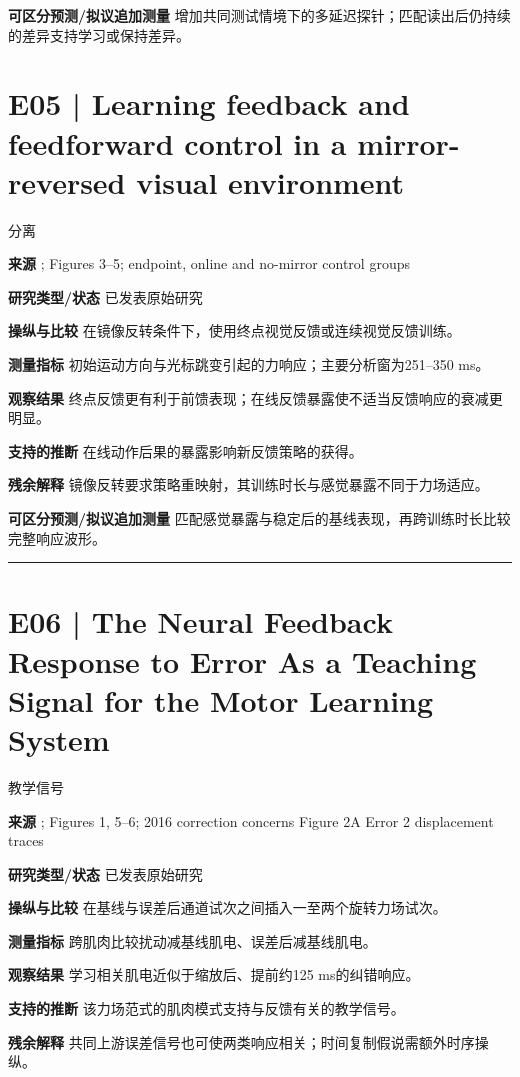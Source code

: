 \documentclass[11pt,a4paper]{article}
\begin{document}
\textbf{可区分预测/拟议追加测量} 增加共同测试情境下的多延迟探针；匹配读出后仍持续的差异支持学习或保持差异。\par
\clearpage\section{E05 | Learning feedback and feedforward control in a mirror-reversed visual environment}
{\small\sffamily\color{navy} 分离}\par
\textbf{来源} \cite{kasuga2015}; Figures 3--5; endpoint, online and no-mirror control groups\par
\textbf{研究类型/状态} 已发表原始研究\par
\textbf{操纵与比较} 在镜像反转条件下，使用终点视觉反馈或连续视觉反馈训练。\par
\textbf{测量指标} 初始运动方向与光标跳变引起的力响应；主要分析窗为251--350 ms。\par
\textbf{观察结果} 终点反馈更有利于前馈表现；在线反馈暴露使不适当反馈响应的衰减更明显。\par
\textbf{支持的推断} 在线动作后果的暴露影响新反馈策略的获得。\par
\textbf{残余解释} 镜像反转要求策略重映射，其训练时长与感觉暴露不同于力场适应。\par
\textbf{可区分预测/拟议追加测量} 匹配感觉暴露与稳定后的基线表现，再跨训练时长比较完整响应波形。\par
\bigskip\hrule\medskip\section{E06 | The Neural Feedback Response to Error As a Teaching Signal for the Motor Learning System}
{\small\sffamily\color{navy} 教学信号}\par
\textbf{来源} \cite{albert2016}; Figures 1, 5--6; 2016 correction concerns Figure 2A Error 2 displacement traces\par
\textbf{研究类型/状态} 已发表原始研究\par
\textbf{操纵与比较} 在基线与误差后通道试次之间插入一至两个旋转力场试次。\par
\textbf{测量指标} 跨肌肉比较扰动减基线肌电、误差后减基线肌电。\par
\textbf{观察结果} 学习相关肌电近似于缩放后、提前约125 ms的纠错响应。\par
\textbf{支持的推断} 该力场范式的肌肉模式支持与反馈有关的教学信号。\par
\textbf{残余解释} 共同上游误差信号也可使两类响应相关；时间复制假说需额外时序操纵。\par
\end{document}
